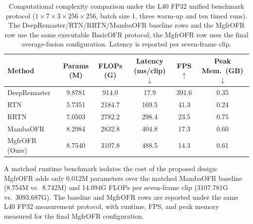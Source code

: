 \begin{table}[htbp]
\caption{Computational complexity comparison under the L40 FP32 unified benchmark protocol ($1{\times}7{\times}3{\times}256{\times}256$, batch size 1, three warm-up and ten timed runs). The DeepRemaster/RTN/RRTN/MambaOFR baseline rows and the MgfrOFR row use the same executable BasicOFR protocol; the MgfrOFR row uses the final average-fusion configuration. Latency is reported per seven-frame clip.\label{tab:complexity}}
\begin{tabularx}{\textwidth}{lCCCCC}
\toprule
\textbf{Method} & \textbf{Params (M)} & \textbf{FLOPs (G)} & \textbf{Latency (ms/clip)$\downarrow$} & \textbf{FPS$\uparrow$} & \textbf{Peak Mem.\ (GB)$\downarrow$} \\
\midrule
DeepRemaster~\cite{iizuka2019deepremaster}   & 9.8781 & 914.0  & 17.9  & 391.6 & 0.35 \\
RTN~\cite{wan2022rtn}                        & 5.7351 & 2184.7 & 169.5 & 41.3  & 0.24 \\
RRTN~\cite{lin2024rrtn}                      & 7.0503 & 2782.2 & 298.4 & 23.5  & 0.75 \\
MambaOFR~\cite{mao2025mambaofr}              & 8.2984 & 2832.8 & 404.8 & 17.3  & 0.60 \\
\midrule
MgfrOFR (Ours)                              & 8.7540 & 3107.8 & 488.5 & 14.3  & 0.61 \\
\bottomrule
\end{tabularx}
\end{table}

A matched runtime benchmark isolates the cost of the proposed design: MgfrOFR adds only 0.012M parameters over the matched MambaOFR baseline (8.754M vs.\ 8.742M) and 14.094G FLOPs per seven-frame clip (3107.781G vs.\ 3093.687G). The baseline and MgfrOFR rows are reported under the same L40 FP32 measurement protocol, with runtime, FPS, and peak memory measured for the final MgfrOFR configuration.

\FloatBarrier
